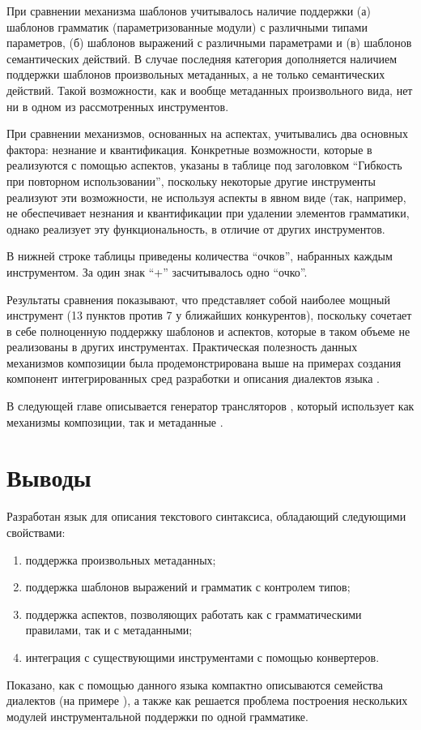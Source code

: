При сравнении механизма шаблонов учитывалось наличие поддержки 
	(а) шаблонов грамматик (параметризованные модули) с различными типами параметров, 
	(б) шаблонов выражений с различными параметрами и
	(в) шаблонов семантических действий. 
В случае \GRM{} последняя категория дополняется наличием поддержки шаблонов произвольных метаданных, а не только семантических действий. Такой возможности, как и вообще метаданных произвольного вида, нет ни в одном из рассмотренных инструментов.

При сравнении механизмов, основанных на аспектах, учитывались два основных фактора: незнание и квантификация. Конкретные возможности, которые в \GRM{} реализуются с помощью аспектов, указаны в таблице под заголовком ``Гибкость при повторном использовании'', поскольку некоторые другие инструменты реализуют эти возможности, не используя аспекты в явном виде (так, например,  не обеспечивает незнания и квантификации при удалении элементов грамматики, однако реализует эту функциональность, в отличие от других инструментов.

В нижней строке таблицы приведены количества ``очков'', набранных каждым инструментом. За один знак ``+'' засчитывалось одно ``очко''.

Результаты сравнения показывают, что \GRM{} представляет собой наиболее мощный инструмент (13 пунктов против 7 у ближайших конкурентов), поскольку сочетает в себе полноценную поддержку шаблонов и аспектов, которые в таком объеме не реализованы в других инструментах. Практическая полезность данных механизмов композиции была продемонстрирована выше на примерах создания компонент интегрированных сред разработки и описания диалектов языка .

В следующей главе описывается генератор трансляторов \ATF{}, который использует как механизмы композиции, так и метаданные \GRM{}.

\chapter{Выводы}

Разработан язык \GRM{} для описания текстового синтаксиса, обладающий следующими свойствами:
\begin{enumerate}
\item поддержка произвольных метаданных;
\item поддержка шаблонов выражений и грамматик с контролем типов;
\item поддержка аспектов, позволяющих работать как с грамматическими правилами, так и с метаданными;
\item интеграция с существующими инструментами с помощью конвертеров.
\end{enumerate}
Показано, как с помощью данного языка компактно описываются семейства диалектов (на примере ), а также как решается проблема построения нескольких модулей инструментальной поддержки по одной грамматике.